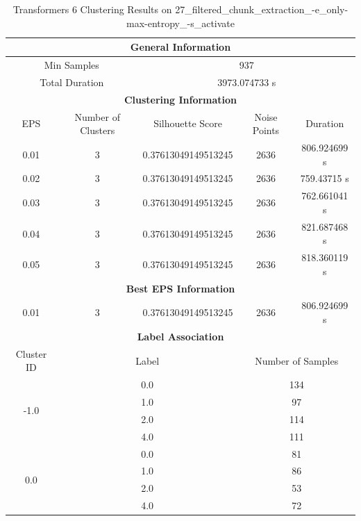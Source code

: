 \begin{longtable}{|c|c|c|c|c|}
\caption{Transformers 6 Clustering Results on 27\_filtered\_chunk\_extraction\_-e\_only-max-entropy\_-s\_activate} \label{tab:27_filtered_chunk_extraction_-e_only-max-entropy_-s_activate_transformers_6_clustering_results}\\
\hline
\multicolumn{5}{|c|}{\textbf{General Information}} \\
\hline
\multicolumn{2}{|c|}{Min Samples} & \multicolumn{3}{c|}{937} \\
\multicolumn{2}{|c|}{Total Duration} & \multicolumn{3}{c|}{3973.074733 s} \\
\hline
\multicolumn{5}{|c|}{\textbf{Clustering Information}} \\
\hline
EPS & Number of Clusters & Silhouette Score & Noise Points & Duration \\
0.01 & 3 & 0.37613049149513245 & 2636 & 806.924699 s\\
0.02 & 3 & 0.37613049149513245 & 2636 & 759.43715 s\\
0.03 & 3 & 0.37613049149513245 & 2636 & 762.661041 s\\
0.04 & 3 & 0.37613049149513245 & 2636 & 821.687468 s\\
0.05 & 3 & 0.37613049149513245 & 2636 & 818.360119 s\\
\hline
\multicolumn{5}{|c|}{\textbf{Best EPS Information}} \\
\hline
0.01 & 3 & 0.37613049149513245 & 2636 & 806.924699 s\\
\hline
\multicolumn{5}{|c|}{\textbf{Label Association}} \\
\hline
Cluster ID & \multicolumn{2}{c|}{Label} & \multicolumn{2}{c|}{Number of Samples} \\
\hline
\multirow{4}{*}{-1.0} & \multicolumn{2}{c|}{0.0} & \multicolumn{2}{c|}{134} \\
& \multicolumn{2}{c|}{1.0} & \multicolumn{2}{c|}{97} \\
& \multicolumn{2}{c|}{2.0} & \multicolumn{2}{c|}{114} \\
& \multicolumn{2}{c|}{4.0} & \multicolumn{2}{c|}{111} \\
\hline
\multirow{4}{*}{0.0} & \multicolumn{2}{c|}{0.0} & \multicolumn{2}{c|}{81} \\
& \multicolumn{2}{c|}{1.0} & \multicolumn{2}{c|}{86} \\
& \multicolumn{2}{c|}{2.0} & \multicolumn{2}{c|}{53} \\
& \multicolumn{2}{c|}{4.0} & \multicolumn{2}{c|}{72} \\

\end{longtable}
